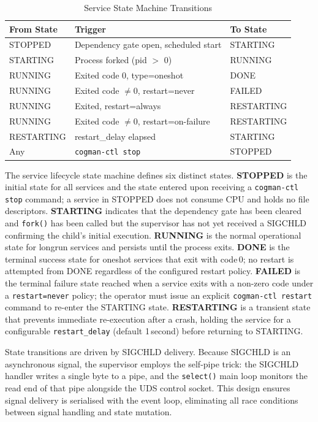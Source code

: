 \documentclass[12pt,a4paper]{report}
\begin{document}
\begin{table}[H]
\centering
\caption{Service State Machine Transitions}
\renewcommand{\arraystretch}{1.2}
\begin{tabularx}{\linewidth}{l X l}
\toprule
\textbf{From State} & \textbf{Trigger} & \textbf{To State}\\
\midrule
STOPPED     & Dependency gate open, scheduled start     & STARTING\\
STARTING    & Process forked (pid $>$ 0)                & RUNNING\\
RUNNING     & Exited code 0, type=oneshot               & DONE\\
RUNNING     & Exited code $\neq$0, restart=never        & FAILED\\
RUNNING     & Exited, restart=always                    & RESTARTING\\
RUNNING     & Exited code $\neq$0, restart=on-failure   & RESTARTING\\
RESTARTING  & restart\_delay elapsed                    & STARTING\\
Any         & \texttt{cogman-ctl stop}                  & STOPPED\\
\bottomrule
\end{tabularx}
\end{table}

The service lifecycle state machine defines six distinct states. \textbf{STOPPED}
is the initial state for all services and the state entered upon receiving a
\texttt{cogman-ctl stop} command; a service in STOPPED does not consume CPU and
holds no file descriptors. \textbf{STARTING} indicates that the dependency gate
has been cleared and \texttt{fork()} has been called but the supervisor has not
yet received a SIGCHLD confirming the child's initial execution. \textbf{RUNNING}
is the normal operational state for longrun services and persists until the process
exits. \textbf{DONE} is the terminal success state for oneshot services that exit
with code\,0; no restart is attempted from DONE regardless of the configured
restart policy. \textbf{FAILED} is the terminal failure state reached when a
service exits with a non-zero code under a \texttt{restart=never} policy; the
operator must issue an explicit \texttt{cogman-ctl restart} command to re-enter
the STARTING state. \textbf{RESTARTING} is a transient state that prevents
immediate re-execution after a crash, holding the service for a configurable
\texttt{restart\_delay} (default 1\,second) before returning to STARTING.

State transitions are driven by SIGCHLD delivery. Because SIGCHLD is an
asynchronous signal, the supervisor employs the self-pipe trick: the SIGCHLD
handler writes a single byte to a pipe, and the \texttt{select()} main loop
monitors the read end of that pipe alongside the UDS control socket. This design
ensures signal delivery is serialised with the event loop, eliminating all race
conditions between signal handling and state mutation.
\end{document}
